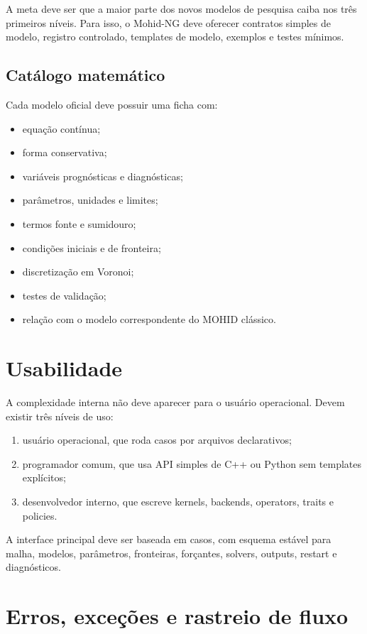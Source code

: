 \documentclass[11pt,a4paper]{article}
\begin{document}
A meta deve ser que a maior parte dos novos modelos de pesquisa caiba nos tr\^es primeiros n\'iveis. Para isso, o Mohid-NG deve oferecer contratos simples de modelo, registro controlado, templates de modelo, exemplos e testes m\'inimos.

\subsection{Cat\'alogo matem\'atico}

Cada modelo oficial deve possuir uma ficha com:
\begin{itemize}
  \item equa\c{c}\~ao cont\'inua;
  \item forma conservativa;
  \item vari\'aveis progn\'osticas e diagn\'osticas;
  \item par\^ametros, unidades e limites;
  \item termos fonte e sumidouro;
  \item condi\c{c}\~oes iniciais e de fronteira;
  \item discretiza\c{c}\~ao em Voronoi;
  \item testes de valida\c{c}\~ao;
  \item rela\c{c}\~ao com o modelo correspondente do MOHID cl\'assico.
\end{itemize}

\section{Usabilidade}

A complexidade interna n\~ao deve aparecer para o usu\'ario operacional. Devem existir tr\^es n\'iveis de uso:
\begin{enumerate}
  \item usu\'ario operacional, que roda casos por arquivos declarativos;
  \item programador comum, que usa API simples de C++ ou Python sem templates expl\'icitos;
  \item desenvolvedor interno, que escreve kernels, backends, operators, traits e policies.
\end{enumerate}

A interface principal deve ser baseada em casos, com esquema est\'avel para malha, modelos, par\^ametros, fronteiras, for\c{c}antes, solvers, outputs, restart e diagn\'osticos.


\section{Erros, exce\c{c}\~oes e rastreio de fluxo}
\end{document}
